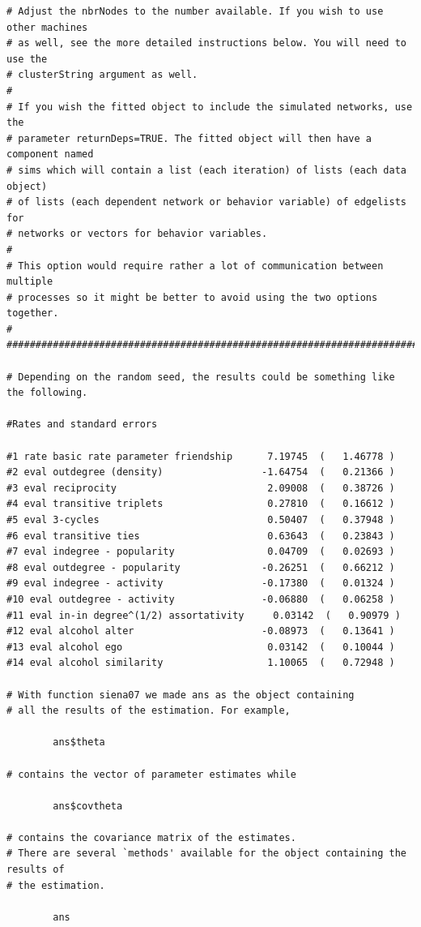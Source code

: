\documentclass[a4paper,fleqn]{article}
\newcommand{\+}{\, + \,}
\begin{document}
{\begin{verbatim}
# Adjust the nbrNodes to the number available. If you wish to use other machines
# as well, see the more detailed instructions below. You will need to use the
# clusterString argument as well.
#
# If you wish the fitted object to include the simulated networks, use the
# parameter returnDeps=TRUE. The fitted object will then have a component named
# sims which will contain a list (each iteration) of lists (each data object)
# of lists (each dependent network or behavior variable) of edgelists for
# networks or vectors for behavior variables.
#
# This option would require rather a lot of communication between multiple
# processes so it might be better to avoid using the two options together.
#
#################################################################################

# Depending on the random seed, the results could be something like the following.

#Rates and standard errors

#1 rate basic rate parameter friendship      7.19745  (   1.46778 )
#2 eval outdegree (density)                 -1.64754  (   0.21366 )
#3 eval reciprocity                          2.09008  (   0.38726 )
#4 eval transitive triplets                  0.27810  (   0.16612 )
#5 eval 3-cycles                             0.50407  (   0.37948 )
#6 eval transitive ties                      0.63643  (   0.23843 )
#7 eval indegree - popularity                0.04709  (   0.02693 )
#8 eval outdegree - popularity              -0.26251  (   0.66212 )
#9 eval indegree - activity                 -0.17380  (   0.01324 )
#10 eval outdegree - activity               -0.06880  (   0.06258 )
#11 eval in-in degree^(1/2) assortativity     0.03142  (   0.90979 )
#12 eval alcohol alter                      -0.08973  (   0.13641 )
#13 eval alcohol ego                         0.03142  (   0.10044 )
#14 eval alcohol similarity                  1.10065  (   0.72948 )

# With function siena07 we made ans as the object containing
# all the results of the estimation. For example,

        ans$theta

# contains the vector of parameter estimates while

        ans$covtheta

# contains the covariance matrix of the estimates.
# There are several `methods' available for the object containing the results of
# the estimation.

        ans


\end{verbatim}}
\end{document}
